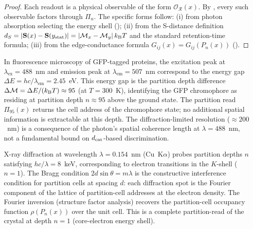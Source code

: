 \begin{proof}
Each readout is a physical observable of the form $\mathcal{O}_\mathcal{R}(x)$.
By , every such observable factors through $\Pi_n$.
The specific forms follow: (i) from photon absorption selecting the energy shell
(); (ii) from the S-distance definition
$d_S = |\mathbf{S}(x) - \mathbf{S}(y_\mathrm{stat})| = |\mathcal{M}_x - \mathcal{M}_y|\,k_{\mathrm{B}} T$
and the standard retention-time formula; (iii) from the
edge-conductance formula $G_{ij}(x) = G_{ij}(P_n(x))$ ().
\end{proof}

\begin{example}
\label{ex:fluorescence}
In fluorescence microscopy of GFP-tagged proteins, the excitation peak at
$\lambda_\mathrm{ex} = 488$~nm and emission peak at $\lambda_\mathrm{em} =
507$~nm correspond to the energy gap $\Delta E = h c/\lambda_\mathrm{em} =
2.45$~eV.  This energy gap is the partition depth difference
$\Delta\mathcal{M} = \Delta E / (k_{\mathrm{B}} T) \approx 95$ (at $T = 300$~K), identifying
the GFP chromophore as residing at partition depth $n \approx 95$ above the
ground state.  The partition read $\Pi_{95}(x)$ returns the cell address of
the chromophore state; no additional spatial information is extractable at
this depth.  The diffraction-limited resolution ($\approx 200$~nm) is a
consequence of the photon's spatial coherence length at $\lambda = 488$~nm,
not a fundamental bound on $d_{\mathrm{cat}}$-based discrimination.
\end{example}

\begin{example}
\label{ex:xray}
X-ray diffraction at wavelength $\lambda = 0.154$~nm (Cu~K$\alpha$) probes
partition depths $n$ satisfying $h c/\lambda = 8$~keV, corresponding to
electron transitions in the $K$-shell ($n=1$).  The Bragg condition
$2d\sin\theta = m\lambda$ is the constructive interference condition for
partition cells at spacing $d$: each diffraction spot is the Fourier component
of the lattice of partition-cell addresses at the electron density.  The
Fourier inversion (structure factor analysis) recovers the partition-cell
occupancy function $\rho(P_n(x))$ over the unit cell.  This is a complete
partition-read of the crystal at depth $n=1$ (core-electron energy shell).
\end{example}


